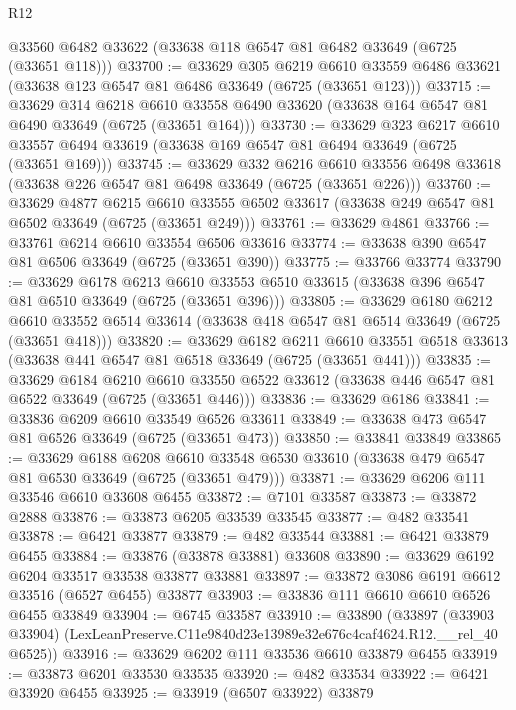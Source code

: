 \begin{lexlean}{R12}
\begin{coremodule}
    @33560
    @6482
    @33622
    (@33638 @118 @6547 @81 @6482 @33649 (@6725 (@33651 @118)))
@33700 := @33629
    @305
    @6219
    @6610
    @33559
    @6486
    @33621
    (@33638 @123 @6547 @81 @6486 @33649 (@6725 (@33651 @123)))
@33715 := @33629
    @314
    @6218
    @6610
    @33558
    @6490
    @33620
    (@33638 @164 @6547 @81 @6490 @33649 (@6725 (@33651 @164)))
@33730 := @33629
    @323
    @6217
    @6610
    @33557
    @6494
    @33619
    (@33638 @169 @6547 @81 @6494 @33649 (@6725 (@33651 @169)))
@33745 := @33629
    @332
    @6216
    @6610
    @33556
    @6498
    @33618
    (@33638 @226 @6547 @81 @6498 @33649 (@6725 (@33651 @226)))
@33760 := @33629
    @4877
    @6215
    @6610
    @33555
    @6502
    @33617
    (@33638 @249 @6547 @81 @6502 @33649 (@6725 (@33651 @249)))
@33761 := @33629 @4861
@33766 := @33761 @6214 @6610 @33554 @6506 @33616
@33774 := @33638 @390 @6547 @81 @6506 @33649 (@6725 (@33651 @390))
@33775 := @33766 @33774
@33790 := @33629
    @6178
    @6213
    @6610
    @33553
    @6510
    @33615
    (@33638 @396 @6547 @81 @6510 @33649 (@6725 (@33651 @396)))
@33805 := @33629
    @6180
    @6212
    @6610
    @33552
    @6514
    @33614
    (@33638 @418 @6547 @81 @6514 @33649 (@6725 (@33651 @418)))
@33820 := @33629
    @6182
    @6211
    @6610
    @33551
    @6518
    @33613
    (@33638 @441 @6547 @81 @6518 @33649 (@6725 (@33651 @441)))
@33835 := @33629
    @6184
    @6210
    @6610
    @33550
    @6522
    @33612
    (@33638 @446 @6547 @81 @6522 @33649 (@6725 (@33651 @446)))
@33836 := @33629 @6186
@33841 := @33836 @6209 @6610 @33549 @6526 @33611
@33849 := @33638 @473 @6547 @81 @6526 @33649 (@6725 (@33651 @473))
@33850 := @33841 @33849
@33865 := @33629
    @6188
    @6208
    @6610
    @33548
    @6530
    @33610
    (@33638 @479 @6547 @81 @6530 @33649 (@6725 (@33651 @479)))
@33871 := @33629 @6206 @111 @33546 @6610 @33608 @6455
@33872 := @7101 @33587
@33873 := @33872 @2888
@33876 := @33873 @6205 @33539 @33545
@33877 := @482 @33541
@33878 := @6421 @33877
@33879 := @482 @33544
@33881 := @6421 @33879 @6455
@33884 := @33876 (@33878 @33881) @33608
@33890 := @33629 @6192 @6204 @33517 @33538 @33877 @33881
@33897 := @33872 @3086 @6191 @6612 @33516 (@6527 @6455) @33877
@33903 := @33836 @111 @6610 @6610 @6526 @6455 @33849
@33904 := @6745 @33587
@33910 := @33890
    (@33897 (@33903 @33904) (LexLeanPreserve.C11e9840d23e13989e32e676c4caf4624.R12.__rel_40 @6525))
@33916 := @33629 @6202 @111 @33536 @6610 @33879 @6455
@33919 := @33873 @6201 @33530 @33535
@33920 := @482 @33534
@33922 := @6421 @33920 @6455
@33925 := @33919 (@6507 @33922) @33879

\end{coremodule}
\end{lexlean}
